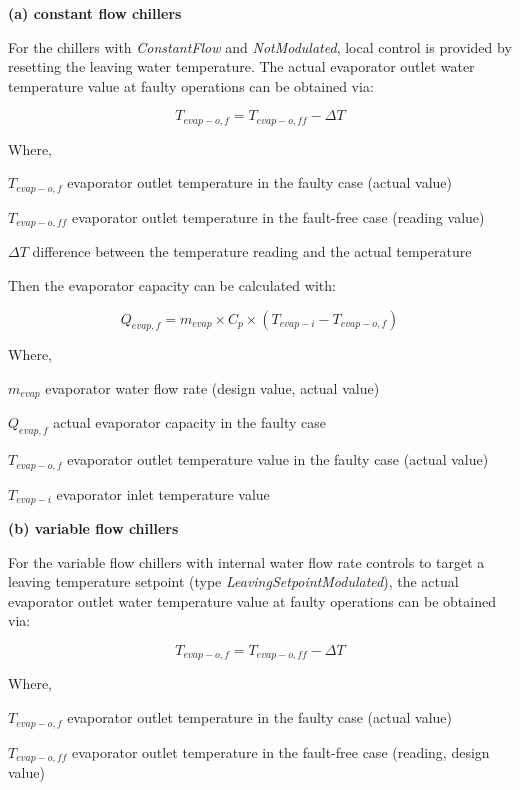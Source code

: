\textbf{(a) constant flow chillers}

For the chillers with \emph{ConstantFlow} and \emph{NotModulated}, local control is provided by resetting the leaving water temperature. The actual evaporator outlet water temperature value at faulty operations can be obtained via:

\begin{equation}
T_{evap-o,f} = T_{evap-o,ff} - \Delta T
\end{equation}

Where, 

\(T_{evap-o,f}\) evaporator outlet temperature in the faulty case (actual value)

\(T_{evap-o,ff}\) evaporator outlet temperature in the fault-free case (reading value)

\(\Delta T\) difference between the temperature reading and the actual temperature

Then the evaporator capacity can be calculated with:

\begin{equation}
Q_{evap,f} = m_{evap} \times C_p \times (T_{evap-i} - T_{evap-o,f} )
\end{equation}

Where, 

\(m_{evap}\) evaporator water flow rate (design value, actual value)

\(Q_{evap,f}\) actual evaporator capacity in the faulty case

\(T_{evap-o,f}\) evaporator outlet temperature value in the faulty case (actual value)

\(T_{evap-i}\) evaporator inlet temperature value \newline

\textbf{(b) variable flow chillers}

For the variable flow chillers with internal water flow rate controls to target a leaving temperature setpoint (type \emph{LeavingSetpointModulated}), the actual evaporator outlet water temperature value at faulty operations can be obtained via:

\begin{equation}
T_{evap-o,f} = T_{evap-o,ff} - \Delta T
\end{equation}

Where, 

\(T_{evap-o,f}\) evaporator outlet temperature in the faulty case (actual value)

\(T_{evap-o,ff}\) evaporator outlet temperature in the fault-free case (reading, design value)

